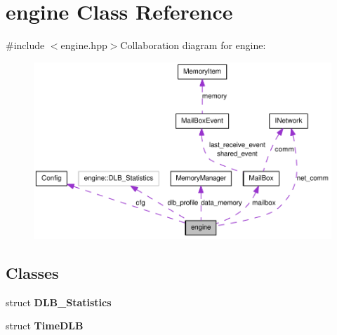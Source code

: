 \hypertarget{classengine}{
\section{engine Class Reference}
\label{classengine}
}


{\ttfamily \#include $<$engine.hpp$>$}Collaboration diagram for engine:\nopagebreak
\begin{figure}[H]
\begin{center}
\leavevmode
\includegraphics[width=400pt]{classengine__coll__graph}
\end{center}
\end{figure}
\subsection*{Classes}
\begin{DoxyCompactItemize}
\item 
struct {\bfseries DLB\_\-Statistics}
\item 
struct {\bfseries TimeDLB}
\end{DoxyCompactItemize}

